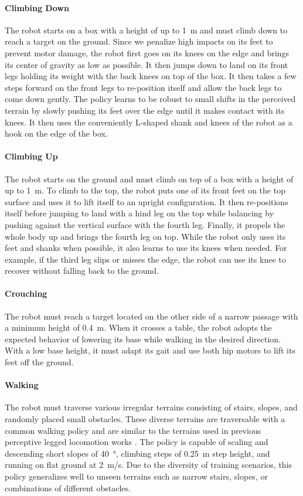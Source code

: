 \documentclass[conference]{IEEEtran}
\begin{document}
\paragraph{Climbing Down}
The robot starts on a box with a height of up to \SI{1}{m} and must climb down to reach a target on the ground. 
Since we penalize high impacts on its feet to prevent motor damage, the robot first goes on its knees on the edge and brings its center of gravity as low as possible.
It then jumps down to land on its front legs holding its weight with the back knees on top of the box. It then takes a few steps forward on the front legs to re-position itself and allow the back legs to come down gently. 
The policy learns to be robust to small shifts in the perceived terrain by slowly pushing its feet over the edge until it makes contact with its knees. It then uses the conveniently L-shaped shank and knees of the robot as a hook on the edge of the box.  

\paragraph{Climbing Up}
The robot starts on the ground and must climb on top of a box with a height of up to \SI{1}{m}. 
To climb to the top, the robot puts one of its front feet on the top surface and uses it to lift itself to an upright configuration. It then re-positions itself before jumping to land with a hind leg on the top while balancing by pushing against the vertical surface with the fourth leg. Finally, it propels the whole body up and brings the fourth leg on top. 
While the robot only uses its feet and shanks when possible, it also learns to use its knees when needed. For example, if the third leg slips or misses the edge, the robot can use its knee to recover without falling back to the ground.

\paragraph{Crouching}
The robot must reach a target located on the other side of a narrow passage with a minimum height of \SI{0.4}{m}. 
When it crosses a table, the robot adopts the expected behavior of lowering its base while walking in the desired direction. With a low base height, it must adapt its gait and use both hip motors to lift its feet off the ground.

\paragraph{Walking}
The robot must traverse various irregular terrains consisting of stairs, slopes, and randomly placed small obstacles. These diverse terrains are traversable with a common walking policy and are similar to the terrains used in previous perceptive legged locomotion works \cite{miki2021locomotion, rudin2022minutes}. 
The policy is capable of scaling and descending short slopes of \SI{40}{\degree}, climbing steps of \SI{0.25}{m} step height, and running on flat ground at \SI{2}{\meter/\second}.
Due to the diversity of training scenarios, this policy generalizes well to unseen terrains such as narrow stairs, slopes, or combinations of different obstacles. 
\end{document}
